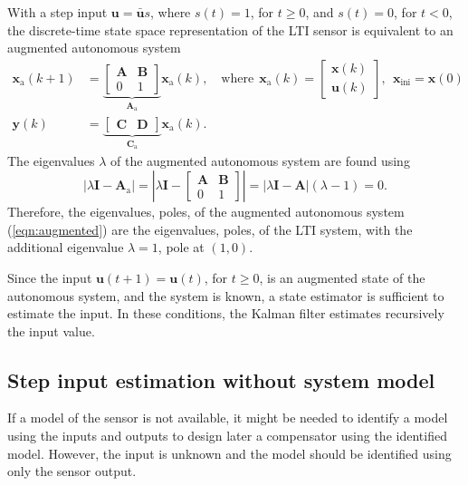 With a step input $\mathbf{u} = \bar{\mathbf{u}} s$, where $s(t) = 1$, for $t \geq 0$, and $s(t) = 0$, for $t < 0$, the discrete-time state space representation of the LTI sensor is equivalent to an augmented autonomous system  
\begin{equation} \begin{aligned} \mathbf{x}_\text{a}(k+1) &= \underbrace{ \begin{bmatrix} \mathbf{A} & \mathbf{B} \\ 0 & 1 \end{bmatrix} }_{\mathbf{A}_\text{a}} \mathbf{x}_\text{a}(k) , \quad \text{where} \ \ \mathbf{x}_\text{a}(k) = \begin{bmatrix} \mathbf{x}(k) \\ \mathbf{u}(k) \end{bmatrix}, \ \ \mathbf{x}_{\text{ini}} = \mathbf{x}(0) \\
\mathbf{y}(k) &= \underbrace{ \begin{bmatrix} \mathbf{C} & \mathbf{D} \end{bmatrix} }_{\mathbf{C}_\text{a}} \mathbf{x}_\text{a}(k) . \label{eqn:augmented} \end{aligned} \end{equation}
The eigenvalues $\lambda$ of the augmented autonomous system are found using
\[ \left| \lambda \mathbf{I} - \mathbf{A}_\text{a} \right| = \left| \lambda \mathbf{I} - \begin{bmatrix} \mathbf{A} & \mathbf{B} \\ 0 & 1 \end{bmatrix} \right| = \left| \lambda \mathbf{I} - \mathbf{A} \right| \left( \lambda - 1 \right) = 0.\]
Therefore, the eigenvalues, poles, of the augmented autonomous system (\ref{eqn:augmented}) are the eigenvalues, poles, of the LTI system, with the additional eigenvalue $\lambda = 1$, pole at $(1,0)$.  

Since the input $\mathbf{u}(t+1) = \mathbf{u}(t)$, for $t \geq 0$, is an augmented state of the autonomous system, and the system is known, a state estimator is sufficient to estimate the input.
In these conditions, the Kalman filter estimates recursively the input value.  

\subsection{Step input estimation without system model}

If a model of the sensor is not available, it might be needed to identify a model using the inputs and outputs to design later a compensator using the identified model.
However, the input is unknown and the model should be identified using only the sensor output.

